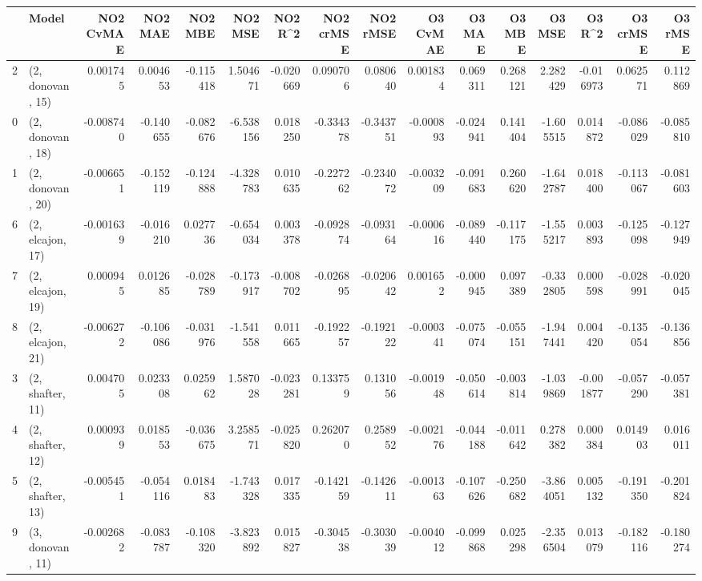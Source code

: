 \begin{tabular}{llrrrrrrrrrrrrrr}
\toprule
{} &             Model &  NO2 CvMAE &   NO2 MAE &   NO2 MBE &    NO2 MSE &   NO2 R\textasciicircum2 &  NO2 crMSE &  NO2 rMSE &  O3 CvMAE &    O3 MAE &    O3 MBE &     O3 MSE &    O3 R\textasciicircum2 &  O3 crMSE &   O3 rMSE \\
\midrule
2  &  (2, donovan, 15) &   0.001745 &  0.004653 & -0.115418 &   1.504671 & -0.020669 &   0.090706 &  0.080640 &  0.001834 &  0.069311 &  0.268121 &   2.282429 & -0.016973 &  0.062571 &  0.112869 \\
0  &  (2, donovan, 18) &  -0.008740 & -0.140655 & -0.082676 &  -6.538156 &  0.018250 &  -0.334378 & -0.343751 & -0.000893 & -0.024941 &  0.141404 &  -1.605515 &  0.014872 & -0.086029 & -0.085810 \\
1  &  (2, donovan, 20) &  -0.006651 & -0.152119 & -0.124888 &  -4.328783 &  0.010635 &  -0.227262 & -0.234072 & -0.003209 & -0.091683 &  0.260620 &  -1.642787 &  0.018400 & -0.113067 & -0.081603 \\
6  &  (2, elcajon, 17) &  -0.001639 & -0.016210 &  0.027736 &  -0.654034 &  0.003378 &  -0.092874 & -0.093164 & -0.000616 & -0.089440 & -0.117175 &  -1.555217 &  0.003893 & -0.125098 & -0.127949 \\
7  &  (2, elcajon, 19) &   0.000945 &  0.012685 & -0.028789 &  -0.173917 & -0.008702 &  -0.026895 & -0.020642 &  0.001652 & -0.000945 &  0.097389 &  -0.332805 &  0.000598 & -0.028991 & -0.020045 \\
8  &  (2, elcajon, 21) &  -0.006272 & -0.106086 & -0.031976 &  -1.541558 &  0.011665 &  -0.192257 & -0.192122 & -0.000341 & -0.075074 & -0.055151 &  -1.947441 &  0.004420 & -0.135054 & -0.136856 \\
3  &  (2, shafter, 11) &   0.004705 &  0.023308 &  0.025962 &   1.587028 & -0.023281 &   0.133759 &  0.131056 & -0.001948 & -0.050614 & -0.003814 &  -1.039869 & -0.001877 & -0.057290 & -0.057381 \\
4  &  (2, shafter, 12) &   0.000939 &  0.018553 & -0.036675 &   3.258571 & -0.025820 &   0.262070 &  0.258952 & -0.002176 & -0.044188 & -0.011642 &   0.278382 &  0.000384 &  0.014903 &  0.016011 \\
5  &  (2, shafter, 13) &  -0.005451 & -0.054116 &  0.018483 &  -1.743328 &  0.017335 &  -0.142159 & -0.142611 & -0.001363 & -0.107626 & -0.250682 &  -3.864051 &  0.005132 & -0.191350 & -0.201824 \\
9  &  (3, donovan, 11) &  -0.002682 & -0.083787 & -0.108320 &  -3.823892 &  0.015827 &  -0.304538 & -0.303039 & -0.004012 & -0.099868 &  0.025298 &  -2.356504 &  0.013079 & -0.182116 & -0.180274 \\

\end{tabular}
